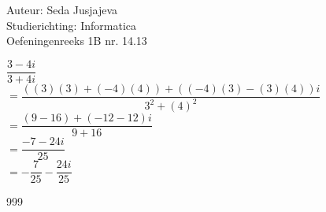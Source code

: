\documentclass[a4paper]{article}
\begin{document}
\noindent \large Auteur: Seda Jusjajeva\\
\noindent \large Studierichting: Informatica\\
\noindent \large Oefeningenreeks 1B nr. 14.13\\

\medskip

\normalsize

$\dfrac{3 - 4i}{3 + 4i}$ \\

$= \dfrac{((3)(3) + (-4)(4)) + ((-4)(3) - (3)(4))i}{3^2 + (4)^2}$ \\

$= \dfrac{(9 - 16) + (-12 - 12)i}{9 + 16}$ \\

$= \dfrac{-7 - 24i}{25}$ \\

$= -\dfrac{7}{25} - \dfrac{24i}{25}$ \\


\begin{thebibliography}{999}
\end{thebibliography}
\end{document}
